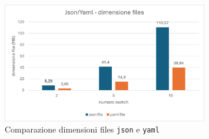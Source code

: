 \documentclass[binding=0.6cm]{sapthesis}
\begin{document}
\begin{figure}[h]
    \centering
    \includegraphics[width=0.8\textwidth]{immagini/json_yaml_files_dim.png}
    \caption{Comparazione dimensioni files \texttt{json} e \texttt{yaml}}
    \label{fig:json_yaml_files_dim}
\end{figure}
\end{document}
